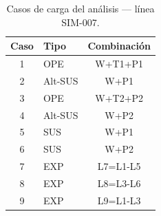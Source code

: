 \begin{table}[htbp]
  \centering
  \small
  \caption{Casos de carga del análisis — línea SIM-007.}
  \label{tab:casos}
  \begin{tabular}{clc}
    \toprule
    Caso & Tipo & Combinaci\'on \\
    \midrule
    1 & OPE & W+T1+P1 \\
    2 & Alt-SUS & W+P1 \\
    3 & OPE & W+T2+P2 \\
    4 & Alt-SUS & W+P2 \\
    5 & SUS & W+P1 \\
    6 & SUS & W+P2 \\
    7 & EXP & L7=L1-L5 \\
    8 & EXP & L8=L3-L6 \\
    9 & EXP & L9=L1-L3 \\
    \bottomrule
  \end{tabular}
\end{table}
